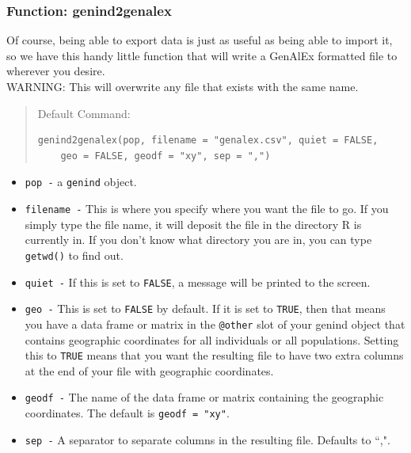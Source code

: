 \documentclass[letterpaper]{article}\usepackage[]{graphicx}\usepackage[]{color}
\makeatletter
\newenvironment{kframe}{%
 \def\at@end@of@kframe{}%
 \ifinner\ifhmode%
  \def\at@end@of@kframe{\end{minipage}}%
  \begin{minipage}{\columnwidth}%
 \fi\fi%
 \def\FrameCommand##1{\hskip\@totalleftmargin \hskip-\fboxsep
 \colorbox{shadecolor}{##1}\hskip-\fboxsep
     \hskip-\linewidth \hskip-\@totalleftmargin \hskip\columnwidth}%
 \MakeFramed {\advance\hsize-\width
   \@totalleftmargin\z@ \linewidth\hsize
   \@setminipage}}%
 {\par\unskip\endMakeFramed%
 \at@end@of@kframe}
\newenvironment{knitrout}{}{} %
\newcommand{\tab}{\hspace*{1em}}
\makeatother
\begin{document}
\subsubsection{Function: genind2genalex}
\label{intro:import:genind2genalex}

\tab\tab Of course, being able to export data is just as useful as being able to import it, so we have this handy little function that will write a GenAlEx formatted file to wherever you desire.\\ 
WARNING: This will overwrite any file that exists with the same name.
\begin{quote}
Default Command:
\begin{knitrout}
\color{fgcolor}\begin{kframe}
\begin{verbatim}
genind2genalex(pop, filename = "genalex.csv", quiet = FALSE, 
    geo = FALSE, geodf = "xy", sep = ",")
\end{verbatim}
\end{kframe}
\end{knitrout}

\end{quote}
\begin{itemize}
  \item \texttt{pop -} a \texttt{genind} object.
  \item \texttt{filename -} This is where you specify where you want the file to go. If you simply type the file name, it will deposit the file in the directory R is currently in. If you don't know what directory you are in, you can type \texttt{getwd()} to find out.
  \item \texttt{quiet -} If this is set to \texttt{FALSE}, a message will be printed to the screen.
  \item \texttt{geo -} This is set to \texttt{FALSE} by default. If it is set to \texttt{TRUE}, then that means you have a data frame or matrix in the \texttt{@other} slot of your genind object that contains geographic coordinates for all individuals or all populations. Setting this to \texttt{TRUE} means that you want the resulting file to have two extra columns at the end of your file with geographic coordinates.
  \item \texttt{geodf -} The name of the data frame or matrix containing the geographic coordinates. The default is \texttt{geodf = "xy"}.
  \item \texttt{sep -} A separator to separate columns in the resulting file.
  Defaults to ``,".
\end{itemize}
\end{document}
